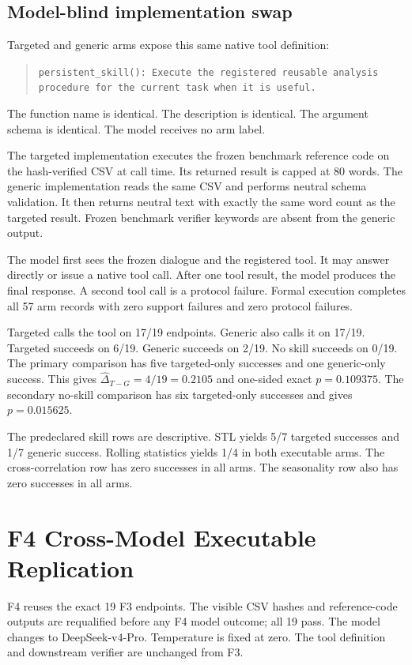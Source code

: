 \subsection{Model-blind implementation swap}
Targeted and generic arms expose this same native tool definition:
\begin{quote}
\texttt{persistent\_skill(): Execute the registered reusable analysis procedure for the current task when it is useful.}
\end{quote}
The function name is identical. The description is identical. The argument schema is identical. The model receives no arm label.

The targeted implementation executes the frozen benchmark reference code on the hash-verified CSV at call time. Its returned result is capped at 80 words. The generic implementation reads the same CSV and performs neutral schema validation. It then returns neutral text with exactly the same word count as the targeted result. Frozen benchmark verifier keywords are absent from the generic output.

The model first sees the frozen dialogue and the registered tool. It may answer directly or issue a native tool call. After one tool result, the model produces the final response. A second tool call is a protocol failure. Formal execution completes all 57 arm records with zero support failures and zero protocol failures.

Targeted calls the tool on 17/19 endpoints. Generic also calls it on 17/19. Targeted succeeds on 6/19. Generic succeeds on 2/19. No skill succeeds on 0/19. The primary comparison has five targeted-only successes and one generic-only success. This gives $\widehat{\Delta}_{T-G}=4/19=0.2105$ and one-sided exact $p=0.109375$. The secondary no-skill comparison has six targeted-only successes and gives $p=0.015625$.

The predeclared skill rows are descriptive. STL yields 5/7 targeted successes and 1/7 generic success. Rolling statistics yields 1/4 in both executable arms. The cross-correlation row has zero successes in all arms. The seasonality row also has zero successes in all arms.

\section{F4 Cross-Model Executable Replication}
\label{app:f4}
F4 reuses the exact 19 F3 endpoints. The visible CSV hashes and reference-code outputs are requalified before any F4 model outcome; all 19 pass. The model changes to DeepSeek-v4-Pro. Temperature is fixed at zero. The tool definition and downstream verifier are unchanged from F3.

